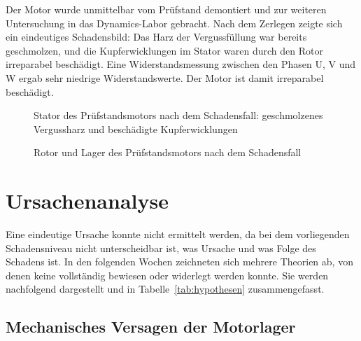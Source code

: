 Der Motor wurde unmittelbar vom Prüfstand demontiert und zur weiteren Untersuchung in das Dynamics-Labor gebracht. Nach dem Zerlegen zeigte sich ein eindeutiges Schadensbild: Das Harz der Vergussfüllung war bereits geschmolzen, und die Kupferwicklungen im Stator waren durch den Rotor irreparabel beschädigt. Eine Widerstandsmessung zwischen den Phasen U, V und W ergab sehr niedrige Widerstandswerte. Der Motor ist damit irreparabel beschädigt.

\begin{figure}[htbp]
    \centering
    \caption{Stator des Prüfstandsmotors nach dem Schadensfall: geschmolzenes Vergussharz und beschädigte Kupferwicklungen}
    \label{fig:schaden_stator}
\end{figure}

\begin{figure}[htbp]
    \centering
    \caption{Rotor und Lager des Prüfstandsmotors nach dem Schadensfall}
    \label{fig:schaden_rotor_lager}
\end{figure}


 
\section{Ursachenanalyse}
\label{sec:ursachenanalyse}
 

Eine eindeutige Ursache konnte nicht ermittelt werden, da bei dem vorliegenden Schadensniveau nicht unterscheidbar ist, was Ursache und was Folge des Schadens ist. In den folgenden Wochen zeichneten sich mehrere Theorien ab, von denen keine vollständig bewiesen oder widerlegt werden konnte. Sie werden nachfolgend dargestellt und in Tabelle~\ref{tab:hypothesen} zusammengefasst.

\subsection{Mechanisches Versagen der Motorlager}
\label{subsec:hyp_lager_mech}

